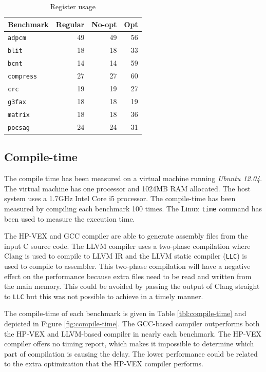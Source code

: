\begin{table}
  \centering
    \begin{tabular}{|l|r|r|r|}
    \hline
    \textbf{Benchmark} & \multicolumn{1}{|r|}{\textbf{Regular}} & \multicolumn{1}{|r|}{\textbf{No-opt}} & \multicolumn{1}{|r|}{\textbf{Opt}} \\ \hline
	\texttt{adpcm} 		&   49  &	49 & 	56 \\ \hline
	\texttt{blit} 		&   18  &	18 & 	33 \\ \hline
	\texttt{bcnt} 		&   14  &	14 & 	59 \\ \hline
	\texttt{compress} 	&   27  &	27 & 	60 \\ \hline
	\texttt{crc} 		&   19  &	19 & 	27 \\ \hline
	\texttt{g3fax} 		&   18  &	18 & 	19 \\ \hline
	\texttt{matrix} 	&   18 	&	18 & 	36 \\ \hline
	\texttt{pocsag}		&   24  &	24 & 	31 \\ \hline
    \end{tabular}
  \caption{Register usage}
  \label{tbl:gen_regs}
\end{table}

\subsection{Compile-time}
The compile time has been measured on a virtual machine running \emph{Ubuntu 12.04}. The virtual machine has one processor and 1024MB RAM allocated. The host system uses a 1.7GHz Intel Core i5 processor. The compile-time has been measured by compiling each benchmark 100 times. The Linux \texttt{time} command has been used to measure the execution time.

The HP-VEX and GCC compiler are able to generate assembly files from the input C source code. The LLVM compiler uses a two-phase compilation where Clang is used to compile to LLVM IR and the LLVM static compiler (\texttt{LLC}) is used to compile to assembler. This two-phase compilation will have a negative effect on the performance because extra files need to be read and written from the main memory. This could be avoided by passing the output of Clang straight to \texttt{LLC} but this was not possible to achieve in a timely manner.

The compile-time of each benchmark is given in Table \ref{tbl:compile-time} and depicted in Figure \ref{fig:compile-time}. The GCC-based compiler outperforms both the HP-VEX and LLVM-based compiler in nearly each benchmark. The HP-VEX compiler offers no timing report, which makes it impossible to determine which part of compilation is causing the delay. The lower performance could be related to the extra optimization that the HP-VEX compiler performs. 

